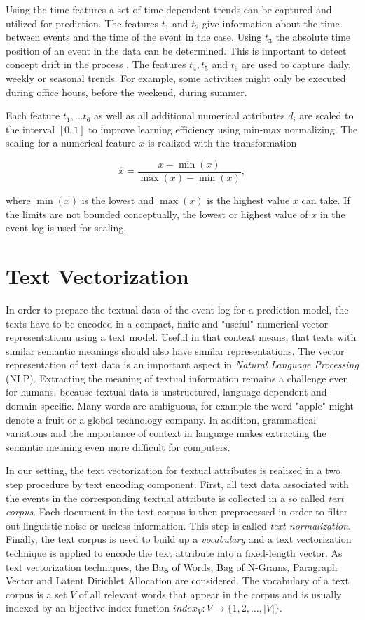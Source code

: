 Using the time features a set of time-dependent trends can be captured and utilized for prediction.
The features $t_1$ and $t_2$ give information about the time between events and the time of the event in the case.
Using $t_3$ the absolute time position of an event in the data can be determined.
This is important to detect concept drift in the process \cite{DBLP:journals/tnn/BoseAZP14}.
The features $t_4, t_5$ and $t_6$ are used to capture daily, weekly or seasonal trends.
For example, some activities might only be executed during office hours, before the weekend, during summer.

Each feature $t_1, \dots t_6$ as well as all additional numerical attributes $d_i$ are scaled to the interval $ [0, 1]$ to improve learning efficiency using min-max normalizing.
The scaling for a numerical feature $x$ is realized with the transformation

$$\hat{x} = \dfrac{x-\min(x)}{\max(x) - \min(x)},$$

where $\min(x)$ is the lowest and $\max(x)$ is the highest value $x$ can take.
If the limits are not bounded conceptually, the lowest or highest value of $x$ in the event log is used for scaling.

\section{Text Vectorization}\label{sec:text}

In order to prepare the textual data of the event log for a prediction model, the texts have to be encoded in a compact, finite and "useful" numerical vector representationu using a text model.
Useful in that context means, that texts with similar semantic meanings should also have similar representations.
The vector representation of text data is an important aspect in \textit{Natural Language Processing} (NLP).
Extracting the meaning of textual information remains a challenge even for humans, because textual data is unstructured, language dependent and domain specific.
Many words are ambiguous, for example the word "apple" might denote a fruit or a global technology company.
In addition, grammatical variations and the importance of context in language makes extracting the semantic meaning even more difficult for computers.

In our setting, the text vectorization for textual attributes is realized in a two step procedure by text encoding component.
First, all text data associated with the events in the corresponding textual attribute is collected in a so called \textit{text corpus}.
Each document in the text corpus is then preprocessed in order to filter out linguistic noise or useless information.
This step is called \textit{text normalization}.
Finally, the text corpus is used to build up a \textit{vocabulary} and a text vectorization technique is applied to encode the text attribute into a fixed-length vector.
As text vectorization techniques, the Bag of Words, Bag of N-Grams, Paragraph Vector and Latent Dirichlet Allocation are considered.
The vocabulary of a text corpus is a set $V$ of all relevant words that appear in the corpus and is usually indexed by an bijective index function $index_V \colon V \to \{1, 2, \dots, |V|\}$.


